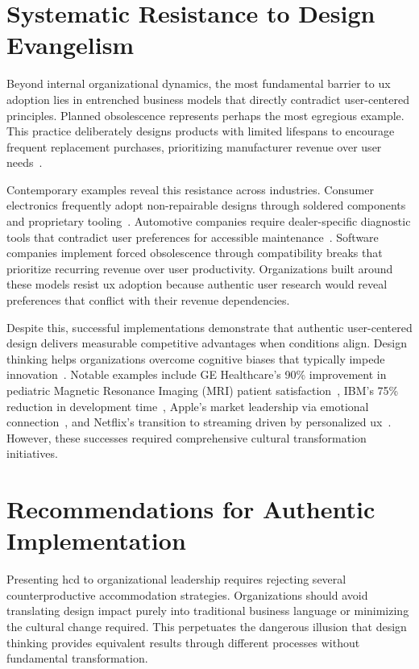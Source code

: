 \documentclass[11pt,showkeys]{essay}
\begin{document}
\section{Systematic Resistance to Design Evangelism}

Beyond internal organizational dynamics, the most fundamental barrier to \gls{ux} adoption lies in entrenched business models that directly contradict user-centered principles. Planned obsolescence represents perhaps the most egregious example. This practice deliberately designs products with limited lifespans to encourage frequent replacement purchases, prioritizing manufacturer revenue over user needs~\cite{slade_made_2006}. 

Contemporary examples reveal this resistance across industries. Consumer electronics frequently adopt non-repairable designs through soldered components and proprietary tooling~\cite{perzanowski_right_2021}. Automotive companies require dealer-specific diagnostic tools that contradict user preferences for accessible maintenance~\cite{eu_right_2024}. Software companies implement forced obsolescence through compatibility breaks that prioritize recurring revenue over user productivity. Organizations built around these models resist \gls{ux} adoption because authentic user research would reveal preferences that conflict with their revenue dependencies.

Despite this, successful implementations demonstrate that authentic user-centered design delivers measurable competitive advantages when conditions align. Design thinking helps organizations overcome cognitive biases that typically impede innovation~\cite{liedtka_why_2018}. Notable examples include GE Healthcare's 90\% improvement in pediatric Magnetic Resonance Imaging (MRI) patient satisfaction~\cite{brown_design_2008}, IBM's 75\% reduction in development time~\cite{datar_ibm_2021}, Apple's market leadership via emotional connection~\cite{thomke_design_2009}, and Netflix's transition to streaming driven by personalized \gls{ux}~\cite{gulati_netflix_2019}. However, these successes required comprehensive cultural transformation initiatives.

\section{Recommendations for Authentic Implementation}

Presenting \gls{hcd} to organizational leadership requires rejecting several counterproductive accommodation strategies. Organizations should avoid translating design impact purely into traditional business language or minimizing the cultural change required. This perpetuates the dangerous illusion that design thinking provides equivalent results through different processes without fundamental transformation. 
\end{document}
